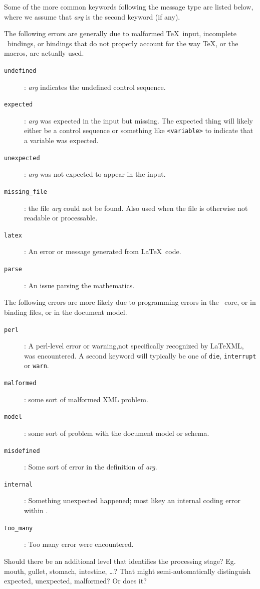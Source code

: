 \documentclass{book}
\begin{document}
Some of the more common keywords following the message type are listed below,
where we assume that \textit{arg} is the second keyword (if any).

The following errors are generally due to malformed \TeX\ input, 
incomplete \LaTeXML\ bindings, or bindings that
do not properly account for the way \TeX, or the macros, are actually used.
\begin{description}
\item[\texttt{undefined}]: \textit{arg} indicates the undefined control sequence.
\item[\texttt{expected}]: \textit{arg} was expected in the input but missing.
 The expected thing will likely either be a control sequence or something like
 \verb|<variable>| to indicate that a variable was expected.
\item[\texttt{unexpected}]: \textit{arg} was not expected to appear in the input.
\item[\texttt{missing\_file}]: the file \textit{arg} could not be found.
  Also used when the file is otherwise not readable or processable.
\item[\texttt{latex}]: An error or message generated from \LaTeX\ code.
\item[\texttt{parse}]: An issue parsing the mathematics.
\end{description}

The following errors are more likely due to programming errors in the
\LaTeXML\ core, or in binding files, or in the document model.
\begin{description}
\item[\texttt{perl}]: A perl-level error or warning,not specifically recognized
 by LaTeXML, was encountered.
 A second keyword will typically be one of \texttt{die}, \texttt{interrupt} or \texttt{warn}.
\item[\texttt{malformed}]: some sort of malformed XML problem.
\item[\texttt{model}]: some sort of problem with the document model or schema.
\item[\texttt{misdefined}]: Some sort of error in the definition of \textit{arg}.
\item[\texttt{internal}]: Something unexpected happened; most likey an
internal coding error within \LaTeXML.
\item[\texttt{too\_many}]: Too many error were encountered.
\end{description}


Should there be an additional level that identifies the processing stage?
Eg.~ mouth, gullet, stomach, intestine, \ldots ?
That might semi-automatically distinguish expected, unexpected, malformed?
Or does it?


\backmatter
\printindex
\end{document}
